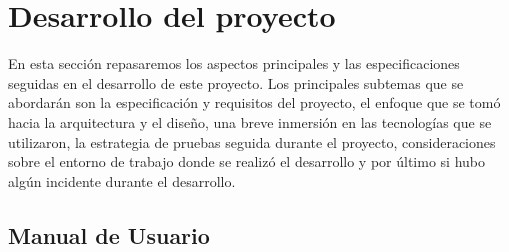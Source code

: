 \section{Desarrollo del proyecto}
En esta sección repasaremos los aspectos principales y las especificaciones seguidas 
en el desarrollo de este proyecto. Los principales subtemas que se abordarán son la 
especificación y requisitos del proyecto, el enfoque que se tomó hacia la arquitectura 
y el diseño, una breve inmersión en las tecnologías que se utilizaron, la estrategia de 
pruebas seguida durante el proyecto, consideraciones sobre el entorno de trabajo donde 
se realizó el desarrollo y por último si hubo algún incidente durante el desarrollo.






\subsection{Manual de Usuario}

\pagebreak